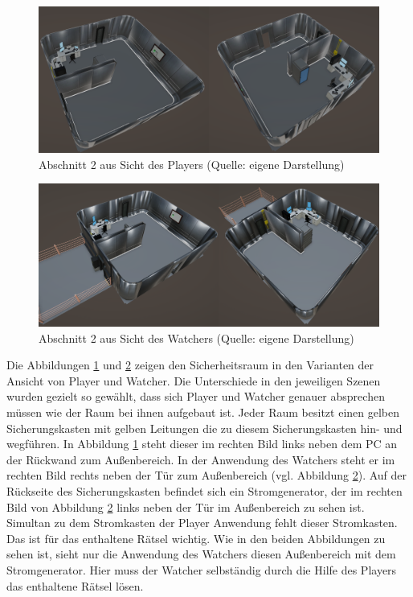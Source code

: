 \begin{figure}[ht]
\centering
\includegraphics[width=1\linewidth]{content/pictures/Abschnitt_01 - Player.png}
\caption{Abschnitt 2 aus Sicht des Players (Quelle: eigene Darstellung)}
\label{fig:section_01_player}
\end{figure}

\begin{figure}[ht]
\centering
\includegraphics[width=1\linewidth]{content/pictures/Abschnitt_01 - Watcher.png}
\caption{Abschnitt 2 aus Sicht des Watchers (Quelle: eigene Darstellung)}
\label{fig:section_01_watcher}
\end{figure}

Die Abbildungen \ref{fig:section_01_player} und \ref{fig:section_01_watcher} zeigen den Sicherheitsraum in den Varianten der Ansicht von Player und Watcher. Die Unterschiede in den jeweiligen Szenen wurden gezielt so gewählt, dass sich Player und Watcher genauer absprechen müssen wie der Raum bei ihnen aufgebaut ist. Jeder Raum besitzt einen gelben Sicherungskasten mit gelben Leitungen die zu diesem Sicherungskasten hin- und wegführen. In Abbildung \ref{fig:section_01_player} steht dieser im rechten Bild links neben dem PC an der Rückwand zum Außenbereich. In der Anwendung des Watchers steht er im rechten Bild rechts neben der Tür zum Außenbereich (vgl. Abbildung \ref{fig:section_01_watcher}). Auf der Rückseite des Sicherungskasten befindet sich ein Stromgenerator, der im rechten Bild von Abbildung \ref{fig:section_01_watcher} links neben der Tür im Außenbereich zu sehen ist. Simultan zu dem Stromkasten der Player Anwendung fehlt dieser Stromkasten. Das ist für das enthaltene Rätsel wichtig. Wie in den beiden Abbildungen zu sehen ist, sieht nur die Anwendung des Watchers diesen Außenbereich mit dem Stromgenerator. Hier muss der Watcher selbständig durch die Hilfe des Players das enthaltene Rätsel lösen.

